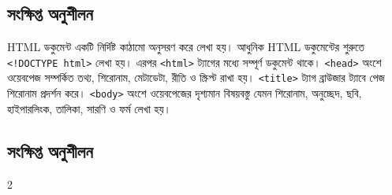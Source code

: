 \subsection{সংক্ষিপ্ত অনুশীলন}

HTML ডকুমেন্ট একটি নির্দিষ্ট কাঠামো অনুসরণ করে লেখা হয়। আধুনিক HTML ডকুমেন্টের শুরুতে \texttt{<!DOCTYPE html>} লেখা হয়। এরপর \texttt{<html>} ট্যাগের মধ্যে সম্পূর্ণ ডকুমেন্ট থাকে। \texttt{<head>} অংশে ওয়েবপেজ সম্পর্কিত তথ্য, শিরোনাম, মেটাডেটা, রীতি ও স্ক্রিপ্ট রাখা হয়। \texttt{<title>} ট্যাগ ব্রাউজার ট্যাবে পেজ শিরোনাম প্রদর্শন করে। \texttt{<body>} অংশে ওয়েবপেজের দৃশ্যমান বিষয়বস্তু যেমন শিরোনাম, অনুচ্ছেদ, ছবি, হাইপারলিংক, তালিকা, সারণি ও ফর্ম লেখা হয়।



\subsection{সংক্ষিপ্ত অনুশীলন}

\begin{multicols}{2}
\noindent\begin{minipage}[t]{\linewidth}\vspace{0pt}
\end{minipage}\par\smallskip
\noindent\begin{minipage}[t]{\linewidth}\vspace{0pt}
\end{minipage}\par\smallskip
\noindent\begin{minipage}[t]{\linewidth}\vspace{0pt}
\end{minipage}\par\smallskip
\noindent\begin{minipage}[t]{\linewidth}\vspace{0pt}
\end{minipage}\par\smallskip
\noindent\begin{minipage}[t]{\linewidth}\vspace{0pt}
\end{minipage}\par\smallskip
\noindent\begin{minipage}[t]{\linewidth}\vspace{0pt}
\end{minipage}\par\smallskip
\end{multicols}

